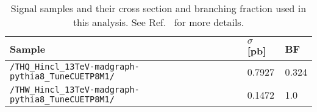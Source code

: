 \begin{table}[ht!]
  \centering \small
  \begin{tabular}{lll}
    Sample & $\sigma$ [pb] & BF \\ \hline
    \verb|/THQ_Hincl_13TeV-madgraph-pythia8_TuneCUETP8M1/| & 0.7927 & 0.324 \\
    \verb|/THW_Hincl_13TeV-madgraph-pythia8_TuneCUETP8M1/| & 0.1472 & 1.0   \\\hline
  \end{tabular}
  \caption[Signal samples and their cross section and branching fraction.]{Signal samples and their cross section and branching fraction used in this analysis. See Ref.~\cite{THQProdTwiki} for more details.}\label{tab:sigsamples}
\end{table}



